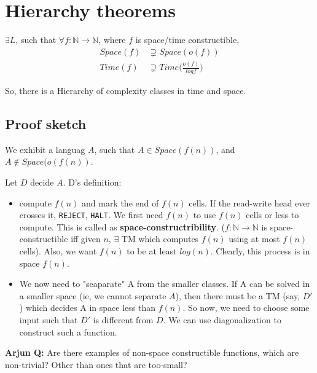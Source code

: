 \section{Hierarchy theorems}
$\exists L$, such that $\forall f: \mathbb{N} \to \mathbb{N}$, where $f$ is
space/time constructible,
\begin{align*}
    Space(f) &\supsetneq Space(o(f)) \\
    Time(f) &\supsetneq Time \bigg (\frac{o(f)}{log f} \bigg )
\end{align*}

So, there is a Hierarchy of complexity classes in time and space.

\subsection{Proof sketch}
We exhibit a languag $A$, such that $A \in Space(f(n))$, and $A \notin Space(o(f(n))$.

Let $D$ decide $A$. D's definition:
\begin{itemize}
    \item compute $f(n)$ and mark the end of $f(n)$ cells. If the read-write head
        ever crosses it, \texttt{REJECT}, \texttt{HALT}. We first need
        $f(n)$ to use $f(n)$ cells or less to compute. This is called as 
        \textbf{space-constructribility}. ($f: \mathbb{N} \to \mathbb{N}$ is
        space-constructible iff given $n$, $\exists$ TM which computes $f(n)$ 
        using at most $f(n)$ cells). Also, we want $f(n)$ to be at least
        $log(n)$. Clearly, this process is in space $f(n)$.

    \item We now need to "seaparate" A from the smaller classes. If A can be
        solved in a smaller space (ie, we cannot separate $A$), then
        there must be a TM (say, $D'$) which decides A in space less than $f(n)$.
        So now, we need to choose some input such that $D'$ is different from $D$.
        We can use diagonalization to construct such a function.
\end{itemize}

\textbf{Arjun Q:} Are there examples of non-space constructible functions, which are non-trivial?
Other than ones that are too-small?







